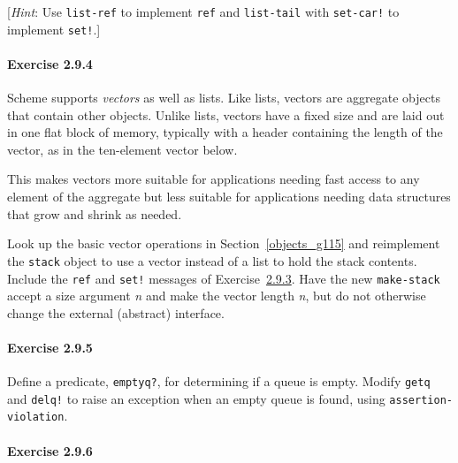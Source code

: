 [\textit{Hint}: Use \texttt{list-ref} to implement \texttt{ref} and \texttt{list-tail}
with \texttt{set-car!} to implement \texttt{set!}.]




\paragraph{Exercise \label{start_g44}2.9.4}


\label{start_s192}\label{start_s193}Scheme supports \textit{vectors} as well as lists.
Like lists, vectors are aggregate objects that contain other
objects.
Unlike lists, vectors have a fixed size and are laid out
in one flat block of memory, typically with a header containing
the length of the vector, as in the ten-element vector below.


\begin{figure}[H]
\centering

\end{figure}



This makes vectors more suitable for applications needing
fast access to any element of the aggregate but less suitable for
applications needing data structures that grow and shrink
as needed.


Look up the basic vector operations in
Section \ref{objects_g115} and reimplement the
\texttt{stack} object to use a vector instead of a list to hold
the stack contents.
Include the \texttt{ref} and \texttt{set!} messages of
Exercise \hyperref[start_g43]{2.9.3}.
Have the new \texttt{make-stack} accept a size argument \textit{n}
and make the vector length \textit{n}, but do not otherwise change
the external (abstract) interface.




\paragraph{Exercise \label{start_g45}2.9.5}


\label{start_s194}Define a predicate, \texttt{emptyq?}, for determining if a queue is empty.
Modify \texttt{getq} and \texttt{delq!} to raise an exception when an empty
queue is found, using \texttt{assertion-violation}.




\paragraph{Exercise \label{start_g46}2.9.6}


